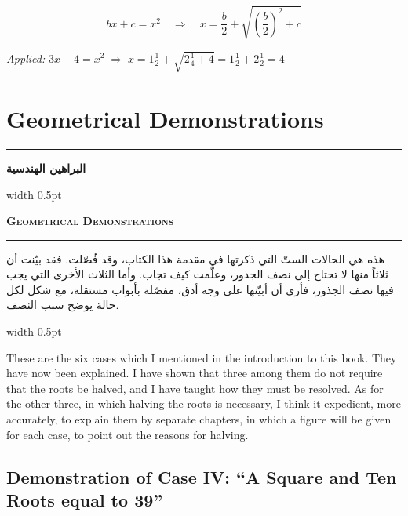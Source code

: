 \documentclass[10pt,a4paper]{book}
\newlength{\colwidth}
\newcommand{\bilingualpair}[2]{%
  \noindent
  \begin{minipage}[t]{\colwidth}
  \begin{flushright}
  \vspace{0pt}
  {\arabicfont\small #1}
  \end{flushright}
  \end{minipage}%
  \hfill\textcolor{columnsepclr}{\vrule width 0.5pt}\hfill
  \begin{minipage}[t]{\colwidth}
  \vspace{0pt}
  {\small #2}
  \end{minipage}%
  \par\vspace{0.6em}
}
\newcommand{\bilingualsectionheader}[2]{%
  \par\vspace{0.8em}
  \noindent
  \begin{minipage}[t]{\colwidth}
  \begin{flushright}
  \textbf{\arabicfont #1}
  \end{flushright}
  \end{minipage}%
  \hfill\textcolor{columnsepclr}{\vrule width 0.5pt}\hfill
  \begin{minipage}[t]{\colwidth}
  \textbf{\textsc{#2}}
  \end{minipage}%
  \par\vspace{0.5em}
}
\begin{document}
\vspace{0.5em}
\begin{mathbox}[title={\textbf{The Algorithm for Case VI}}]
\begin{equation}
bx + c = x^2 \quad\Longrightarrow\quad x = \frac{b}{2} + \sqrt{\left(\frac{b}{2}\right)^2 + c}
\end{equation}

\textit{Applied:} $3x + 4 = x^2 \;\Rightarrow\; x = 1\tfrac{1}{2} + \sqrt{2\tfrac{1}{4} + 4} = 1\tfrac{1}{2} + 2\tfrac{1}{2} = 4$
\end{mathbox}
\vspace{0.5em}

\newpage


\chapter{Geometrical Demonstrations}
\label{ch:geom}

\noindent\textcolor{columnsepclr}{\rule{\textwidth}{0.6pt}}\par\vspace{0.3em}
\bilingualsectionheader{البراهين الهندسية}{Geometrical Demonstrations}
\noindent\textcolor{columnsepclr}{\rule{\textwidth}{0.6pt}}\par\vspace{0.5em}

\bilingualpair{
هذه هي الحالات الستّ التي ذكرتها في مقدمة هذا الكتاب، وقد
فُصّلت. فقد بيّنت أن ثلاثاً منها لا تحتاج إلى نصف الجذور، وعلّمت
كيف تجاب. وأما الثلاث الأخرى التي يجب فيها نصف الجذور، فأرى
أن أبيّنها على وجه أدق، مفصّلة بأبواب مستقلة، مع شكل لكل
حالة يوضح سبب النصف.
}{
These are the six cases which I mentioned in the introduction to this
book. They have now been explained. I have shown that three among them do
not require that the roots be halved, and I have taught how they must be resolved.
As for the other three, in which halving the roots is necessary, I think it
expedient, more accurately, to explain them by separate chapters, in which a
figure will be given for each case, to point out the reasons for halving.
}

\section{Demonstration of Case IV: ``A Square and Ten Roots equal to 39''}
\end{document}
